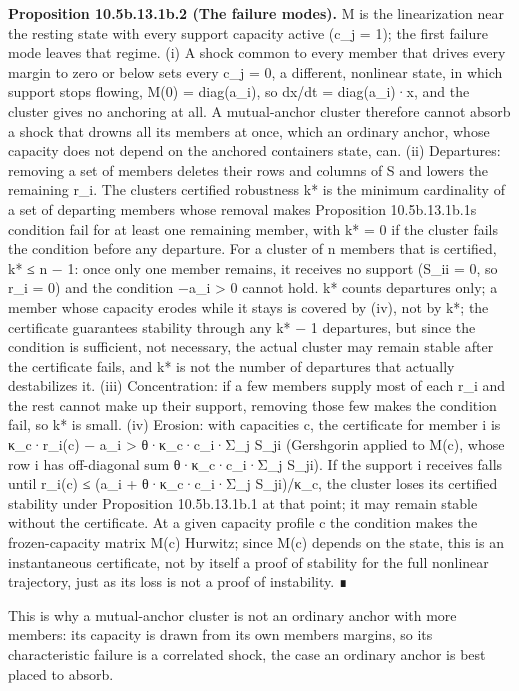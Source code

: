 \documentclass[
]{article}
\begin{document}
\textbf{Proposition 10.5b.13.1b.2 (The failure modes).} M is the
linearization near the resting state with every support capacity active
(c\_j = 1); the first failure mode leaves that regime. (i) A shock
common to every member that drives every margin to zero or below sets
every c\_j = 0, a different, nonlinear state, in which support stops
flowing, M(0) = diag(a\_i), so dx/dt = diag(a\_i)·x, and the cluster
gives no anchoring at all. A mutual-anchor cluster therefore cannot
absorb a shock that drowns all its members at once, which an ordinary
anchor, whose capacity does not depend on the anchored
container\textquotesingle s state, can. (ii) Departures: removing a set
of members deletes their rows and columns of S and lowers the remaining
r\_i. The cluster\textquotesingle s certified robustness k* is the
minimum cardinality of a set of departing members whose removal makes
Proposition 10.5b.13.1b.1\textquotesingle s condition fail for at least
one remaining member, with k* = 0 if the cluster fails the condition
before any departure. For a cluster of n members that is certified, k* ≤
n − 1: once only one member remains, it receives no support (S\_ii = 0,
so r\_i = 0) and the condition −a\_i \textgreater{} 0 cannot hold. k*
counts departures only; a member whose capacity erodes while it stays is
covered by (iv), not by k*; the certificate guarantees stability through
any k* − 1 departures, but since the condition is sufficient, not
necessary, the actual cluster may remain stable after the certificate
fails, and k* is not the number of departures that actually destabilizes
it. (iii) Concentration: if a few members supply most of each r\_i and
the rest cannot make up their support, removing those few makes the
condition fail, so k* is small. (iv) Erosion: with capacities c, the
certificate for member i is κ\_c·r\_i(c) − a\_i \textgreater{}
θ·κ\_c·c\_i·Σ\_j S\_ji (Gershgorin applied to M(c), whose row i has
off-diagonal sum θ·κ\_c·c\_i·Σ\_j S\_ji). If the support i receives
falls until r\_i(c) ≤ (a\_i + θ·κ\_c·c\_i·Σ\_j S\_ji)/κ\_c, the cluster
loses its certified stability under Proposition 10.5b.13.1b.1 at that
point; it may remain stable without the certificate. At a given capacity
profile c the condition makes the frozen-capacity matrix M(c) Hurwitz;
since M(c) depends on the state, this is an instantaneous certificate,
not by itself a proof of stability for the full nonlinear trajectory,
just as its loss is not a proof of instability. ∎

This is why a mutual-anchor cluster is not an ordinary anchor with more
members: its capacity is drawn from its own members\textquotesingle{}
margins, so its characteristic failure is a correlated shock, the case
an ordinary anchor is best placed to absorb.
\end{document}
